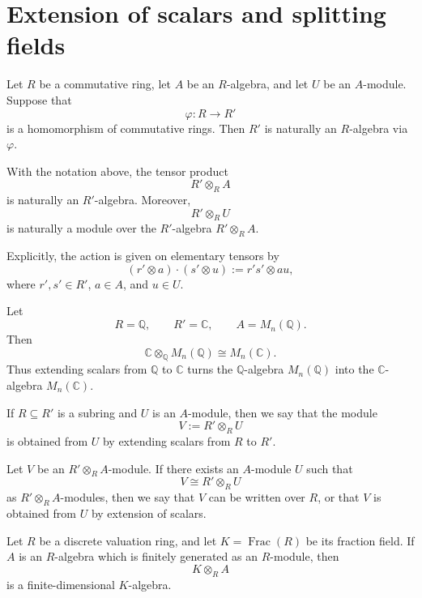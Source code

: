\section{Extension of scalars and splitting fields}

    Let \(R\) be a commutative ring, let \(A\) be an \(R\)-algebra, and let \(U\)
    be an \(A\)-module. Suppose that
    \[
        \varphi:R\longrightarrow R'
    \]
    is a homomorphism of commutative rings. Then \(R'\) is naturally an
    \(R\)-algebra via \(\varphi\).

\begin{definition}
    With the notation above, the tensor product
    \[
        R'\otimes_R A
    \]
    is naturally an \(R'\)-algebra. Moreover,
    \[
        R'\otimes_R U
    \]
    is naturally a module over the \(R'\)-algebra \(R'\otimes_R A\).

    Explicitly, the action is given on elementary tensors by
    \[
        (r'\otimes a)\cdot (s'\otimes u)
        :=
        r's'\otimes au,
    \]
    where \(r',s'\in R'\), \(a\in A\), and \(u\in U\).
\end{definition}

\begin{example}
    Let
    \[
        R=\mathbb{Q},
        \qquad
        R'=\mathbb{C},
        \qquad
        A=M_n(\mathbb{Q}).
    \]
    Then
    \[
        \mathbb{C}\otimes_{\mathbb{Q}}M_n(\mathbb{Q})
        \cong M_n(\mathbb{C}).
    \]
    Thus extending scalars from \(\mathbb{Q}\) to \(\mathbb{C}\) turns the
    \(\mathbb{Q}\)-algebra \(M_n(\mathbb{Q})\) into the \(\mathbb{C}\)-algebra
    \(M_n(\mathbb{C})\).
\end{example}

\begin{remark}
    If \(R\subseteq R'\) is a subring and \(U\) is an \(A\)-module, then we say that
    the module
    \[
        V:=R'\otimes_R U
    \]
    is obtained from \(U\) by extending scalars from \(R\) to \(R'\).
\end{remark}

\begin{definition}
    Let \(V\) be an \(R'\otimes_R A\)-module. If there exists an \(A\)-module \(U\)
    such that
    \[
        V\cong R'\otimes_R U
    \]
    as \(R'\otimes_R A\)-modules, then we say that \(V\) can be written over \(R\),
    or that \(V\) is obtained from \(U\) by extension of scalars.
\end{definition}

\begin{example}
    Let \(R\) be a discrete valuation ring, and let \(K=\operatorname{Frac}(R)\) be
    its fraction field. If \(A\) is an \(R\)-algebra which is finitely generated as
    an \(R\)-module, then
    \[
        K\otimes_R A
    \]
    is a finite-dimensional \(K\)-algebra.
\end{example}

